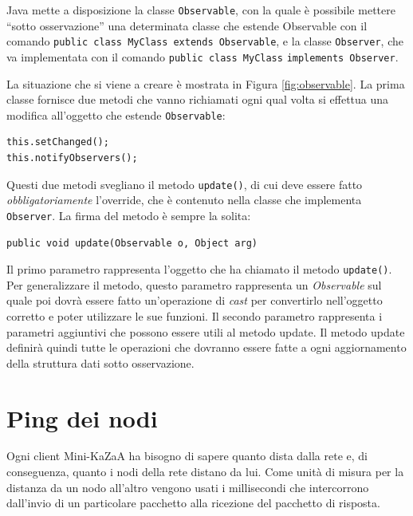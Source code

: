 Java mette a disposizione la classe \verb|Observable|,%
con la quale è possibile mettere ``sotto osservazione'' una determinata classe che estende Observable con il comando \verb|public class MyClass extends Observable|, e la classe \verb|Observer|, che va implementata con il comando \verb|public class MyClass| \verb|implements Observer|.

La situazione che si viene a creare è mostrata in Figura \ref{fig:observable}.
La prima classe fornisce due metodi che vanno richiamati ogni qual volta si effettua una modifica all'oggetto che estende \verb|Observable|:
\begin{lstlisting}
this.setChanged();
this.notifyObservers();
\end{lstlisting}
Questi due metodi svegliano il metodo \verb|update()|, di cui deve essere fatto \emph{obbligatoriamente} l'override, che è contenuto nella classe che implementa \verb|Observer|.
La firma del metodo è sempre la solita:
\begin{lstlisting}
public void update(Observable o, Object arg)
\end{lstlisting}
Il primo parametro rappresenta l'oggetto che ha chiamato il metodo \verb|update()|. Per generalizzare il metodo,
questo parametro rappresenta un \emph{Observable} sul quale poi dovrà essere fatto un'operazione di \emph{cast}
per convertirlo nell'oggetto corretto e poter utilizzare le sue funzioni. Il secondo parametro rappresenta i parametri aggiuntivi che possono essere utili al metodo update.
Il metodo update definirà quindi tutte le operazioni che dovranno essere fatte a ogni aggiornamento della struttura dati sotto osservazione.

\section{Ping dei nodi}\label{sec:ping}
Ogni client Mini-KaZaA ha bisogno di sapere quanto dista dalla rete e, di conseguenza, quanto i nodi della rete distano da lui.
Come unità di misura per la distanza da un nodo all'altro vengono usati i millisecondi che intercorrono dall'invio di un particolare pacchetto alla ricezione del pacchetto di risposta.

